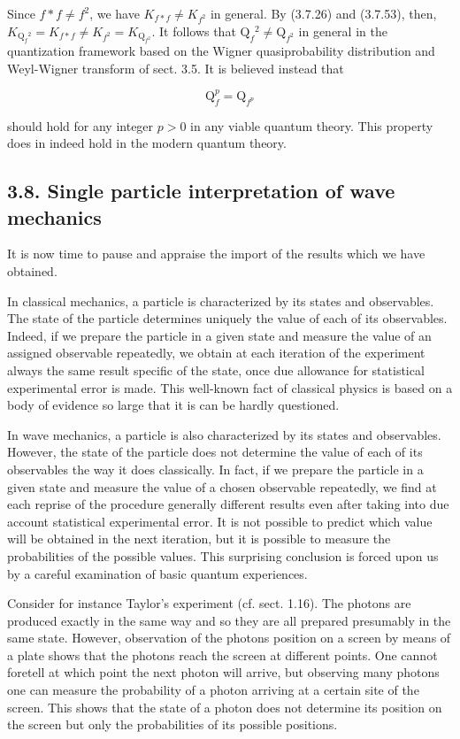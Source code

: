 \documentclass{article}
\begin{document}
Since $f * f \neq f^{2}$, we have $K_{f * f} \neq K_{f^{2}}$ in general. By (3.7.26) and (3.7.53), then, $K_{\mathrm{Q}_{f}{ }^{2}}=K_{f * f} \neq K_{f^{2}}=K_{\mathrm{Q}_{f^{2}}}$. It follows that $\mathrm{Q}_{f}{ }^{2} \neq \mathrm{Q}_{f^{2}}$ in general in the quantization framework based on the Wigner quasiprobability distribution and Weyl-Wigner transform of sect. 3.5. It is believed instead that
 
\begin{equation*}
\mathrm{Q}_{f}^{p}=\mathrm{Q}_{f^{p}} \tag{3.7.55}
\end{equation*}
 
should hold for any integer $p>0$ in any viable quantum theory. This property does in indeed hold in the modern quantum theory.

\subsection*{3.8. Single particle interpretation of wave mechanics}

It is now time to pause and appraise the import of the results which we have obtained.

In classical mechanics, a particle is characterized by its states and observables. The state of the particle determines uniquely the value of each of its observables. Indeed, if we prepare the particle in a given state and measure the value of an assigned observable repeatedly, we obtain at each iteration of the experiment always the same result specific of the state, once due allowance for statistical experimental error is made. This well-known fact of classical physics is based on a body of evidence so large that it is can be hardly questioned.

In wave mechanics, a particle is also characterized by its states and observables. However, the state of the particle does not determine the value of each of its observables the way it does classically. In fact, if we prepare the particle in a given state and measure the value of a chosen observable repeatedly, we find at each reprise of the procedure generally different results even after taking into due account statistical experimental error. It is not possible to predict which value will be obtained in the next iteration, but it is possible to measure the probabilities of the possible values. This surprising conclusion is forced upon us by a careful examination of basic quantum experiences.

Consider for instance Taylor's experiment (cf. sect. 1.16). The photons are produced exactly in the same way and so they are all prepared presumably in the same state. However, observation of the photons position on a screen by means of a plate shows that the photons reach the screen at different points. One cannot foretell at which point the next photon will arrive, but observing many photons one can measure the probability of a photon arriving at a certain site of the screen. This shows that the state of a photon does not determine its position on the screen but only the probabilities of its possible positions.
\end{document}
